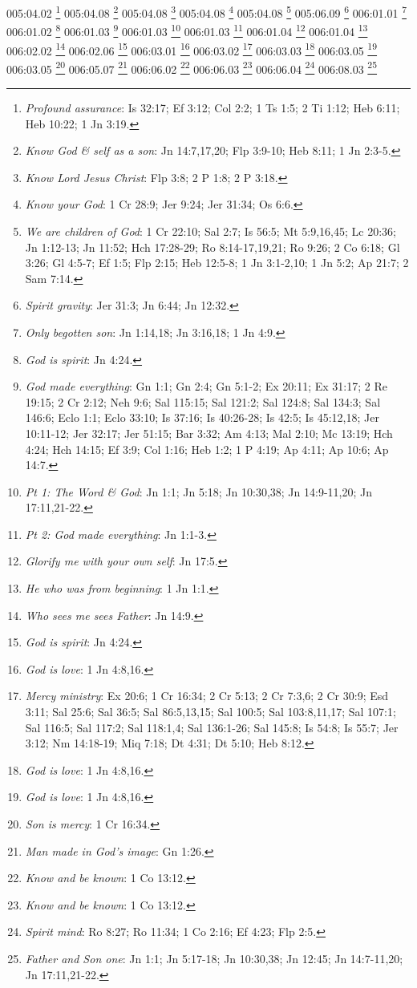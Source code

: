 {005:04.02 \footnote{\textit{Profound assurance}: Is 32:17; Ef 3:12; Col 2:2; 1 Ts 1:5; 2 Ti 1:12; Heb 6:11; Heb 10:22; 1 Jn 3:19.}
005:04.08 \footnote{\textit{Know God & self as a son}: Jn 14:7,17,20; Flp 3:9-10; Heb 8:11; 1 Jn 2:3-5.}
005:04.08 \footnote{\textit{Know Lord Jesus Christ}: Flp 3:8; 2 P 1:8; 2 P 3:18.}
005:04.08 \footnote{\textit{Know your God}: 1 Cr 28:9; Jer 9:24; Jer 31:34; Os 6:6.}
005:04.08 \footnote{\textit{We are children of God}: 1 Cr 22:10; Sal 2:7; Is 56:5; Mt 5:9,16,45; Lc 20:36; Jn 1:12-13; Jn 11:52; Hch 17:28-29; Ro 8:14-17,19,21; Ro 9:26; 2 Co 6:18; Gl 3:26; Gl 4:5-7; Ef 1:5; Flp 2:15; Heb 12:5-8; 1 Jn 3:1-2,10; 1 Jn 5:2; Ap 21:7; 2 Sam 7:14.}
005:06.09 \footnote{\textit{Spirit gravity}: Jer 31:3; Jn 6:44; Jn 12:32.}
006:01.01 \footnote{\textit{Only begotten son}: Jn 1:14,18; Jn 3:16,18; 1 Jn 4:9.}
006:01.02 \footnote{\textit{God is spirit}: Jn 4:24.}
006:01.03 \footnote{\textit{God made everything}: Gn 1:1; Gn 2:4; Gn 5:1-2; Ex 20:11; Ex 31:17; 2 Re 19:15; 2 Cr 2:12; Neh 9:6; Sal 115:15; Sal 121:2; Sal 124:8; Sal 134:3; Sal 146:6; Eclo 1:1; Eclo 33:10; Is 37:16; Is 40:26-28; Is 42:5; Is 45:12,18; Jer 10:11-12; Jer 32:17; Jer 51:15; Bar 3:32; Am 4:13; Mal 2:10; Mc 13:19; Hch 4:24; Hch 14:15; Ef 3:9; Col 1:16; Heb 1:2; 1 P 4:19; Ap 4:11; Ap 10:6; Ap 14:7.}
006:01.03 \footnote{\textit{Pt 1: The Word & God}: Jn 1:1; Jn 5:18; Jn 10:30,38; Jn 14:9-11,20; Jn 17:11,21-22.}
006:01.03 \footnote{\textit{Pt 2: God made everything}: Jn 1:1-3.}
006:01.04 \footnote{\textit{Glorify me with your own self}: Jn 17:5.}
006:01.04 \footnote{\textit{He who was from beginning}: 1 Jn 1:1.}
006:02.02 \footnote{\textit{Who sees me sees Father}: Jn 14:9.}
006:02.06 \footnote{\textit{God is spirit}: Jn 4:24.}
006:03.01 \footnote{\textit{God is love}: 1 Jn 4:8,16.}
006:03.02 \footnote{\textit{Mercy ministry}: Ex 20:6; 1 Cr 16:34; 2 Cr 5:13; 2 Cr 7:3,6; 2 Cr 30:9; Esd 3:11; Sal 25:6; Sal 36:5; Sal 86:5,13,15; Sal 100:5; Sal 103:8,11,17; Sal 107:1; Sal 116:5; Sal 117:2; Sal 118:1,4; Sal 136:1-26; Sal 145:8; Is 54:8; Is 55:7; Jer 3:12; Nm 14:18-19; Miq 7:18; Dt 4:31; Dt 5:10; Heb 8:12.}
006:03.03 \footnote{\textit{God is love}: 1 Jn 4:8,16.}
006:03.05 \footnote{\textit{God is love}: 1 Jn 4:8,16.}
006:03.05 \footnote{\textit{Son is mercy}: 1 Cr 16:34.}
006:05.07 \footnote{\textit{Man made in God's image}: Gn 1:26.}
006:06.02 \footnote{\textit{Know and be known}: 1 Co 13:12.}
006:06.03 \footnote{\textit{Know and be known}: 1 Co 13:12.}
006:06.04 \footnote{\textit{Spirit mind}: Ro 8:27; Ro 11:34; 1 Co 2:16; Ef 4:23; Flp 2:5.}
006:08.03 \footnote{\textit{Father and Son one}: Jn 1:1; Jn 5:17-18; Jn 10:30,38; Jn 12:45; Jn 14:7-11,20; Jn 17:11,21-22.}
}
